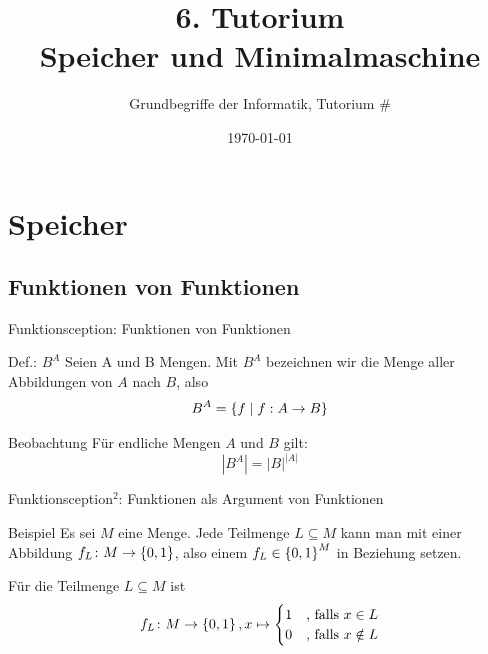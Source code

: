 



\title[Speicher und Minimalmaschine]{6. Tutorium\\ Speicher und Minimalmaschine}
\subtitle{Grundbegriffe der Informatik, Tutorium \#\mytutnumber}
\date{\today}


\titleframe
\roadmap

\section{Speicher}
\subsection{Funktionen von Funktionen}

\begin{frame}{Funktionsception: Funktionen von Funktionen}
	\begin{block}{Def.: $B^A$}
		Seien A und B Mengen. Mit $B^A$ bezeichnen wir die Menge aller Abbildungen von $A$ nach $B$, also $$B^A = \left\{ f \mid f : A \to B  \right\}$$
	\end{block}

	\begin{block}{Beobachtung}
		Für endliche Mengen $A$ und $B$ gilt:
		$$|B^A| = |B|^{|A|}$$
	\end{block}
\end{frame}

\begin{frame}{Funktionsception${}^2$: Funktionen als Argument von Funktionen}

	\begin{exampleblock}{Beispiel}
		\small Es sei $M$ eine Menge. Jede Teilmenge $L \subseteq M$ kann man mit einer Abbildung $f_L \colon M \to \left\{ 0,1 \right\}$, also einem $f_L \in \left\{ 0,1 \right\}^M$ in Beziehung setzen.

		Für die Teilmenge $L \subseteq M$ ist 
		\begin{equation*} 
			f_L \colon M \to \left\{ 0,1 \right\}, x \mapsto
			\begin{cases}
				1 & \text{, falls } x \in L \\
				0 & \text{, falls } x \notin L
			\end{cases}
		\end{equation*}
	\end{exampleblock}
\end{frame}

